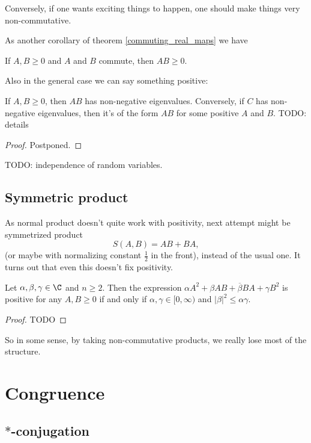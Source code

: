 Conversely, if one wants exciting things to happen, one should make things very non-commutative.

As another corollary of theorem \ref{commuting_real_maps} we have

\begin{kor}
	If $A, B \geq 0$ and $A$ and $B$ commute, then $AB \geq 0$.
\end{kor}

Also in the general case we can say something positive:

\begin{prop}
	If $A, B \geq 0$, then $AB$ has non-negative eigenvalues. Conversely, if $C$ has non-negative eigenvalues, then it's of the form $AB$ for some positive $A$ and $B$. TODO: details
\end{prop}
\begin{proof}
	Postponed.
\end{proof}

TODO: independence of random variables.

\subsection{Symmetric product}

As normal product doesn't quite work with positivity, next attempt might be symmetrized product
\[
	S(A, B) = AB + BA,
\]
(or maybe with normalizing constant $\frac{1}{2}$ in the front), instead of the usual one. It turns out that even this doesn't fix positivity.

\begin{prop}
	Let $\alpha, \beta, \gamma \in \C$ and $n \geq 2$. Then the expression $\alpha A^{2} + \beta AB + \overline{\beta} BA + \gamma B^{2}$ is positive for any $A, B \geq 0$ if and only if $\alpha, \gamma \in [0, \infty)$ and $|\beta|^{2} \leq \alpha \gamma$.
\end{prop}
\begin{proof}
	TODO
\end{proof}

So in some sense, by taking non-commutative products, we really lose most of the structure.

\section{Congruence}

\subsection{$*$-conjugation}

